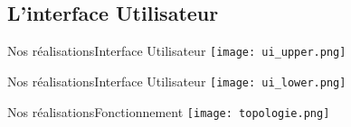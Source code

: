 \subsection{L'interface Utilisateur}

\begin{frame}{Nos réalisations}{Interface Utilisateur}
    \texttt{[image: ui\_upper.png]}
\end{frame}

\begin{frame}{Nos réalisations}{Interface Utilisateur}
    \texttt{[image: ui\_lower.png]}
\end{frame}

\begin{frame}{Nos réalisations}{Fonctionnement}
    \texttt{[image: topologie.png]}
\end{frame}